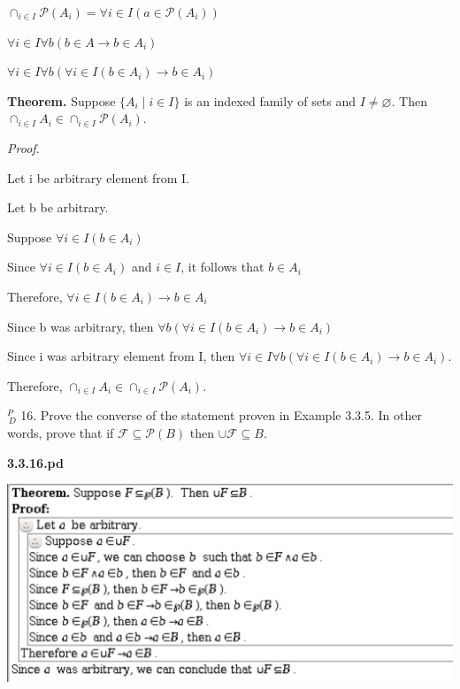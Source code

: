 \documentclass{article}
\begin{document}
$\cap_{i \in I} \mathcal{P} (A_i) = \forall i \in I (a \in \mathcal{P}(A_i))$

$\forall i \in I \forall b (b \in A \to b \in A_i)$

$\forall i \in I \forall b (\forall i \in I (b \in A_i) \to b \in A_i)$

\vspace{20pt}

\textbf{Theorem.} Suppose $\{A_i \mid i \in I\}$ is an indexed family of sets and $I \neq \varnothing$. Then $\cap_{i \in I} A_i \in \cap_{i \in I} \mathcal{P} (A_i)$.

\textit{Proof.}

Let i be arbitrary element from I.

\quad Let b be arbitrary.

\quad \quad Suppose $\forall i \in I (b \in A_i)$

\quad \quad \quad Since $\forall i \in I (b \in A_i)$ and $i \in I$, it follows that $b \in A_i$

\quad \quad Therefore, $\forall i \in I (b \in A_i) \to b \in A_i$

\quad Since b was arbitrary, then $\forall b (\forall i \in I (b \in A_i) \to b \in A_i)$

Since i was arbitrary element from I, then $\forall i \in I \forall b (\forall i \in I (b \in A_i) \to b \in A_i)$.

Therefore, $\cap_{i \in I} A_i \in \cap_{i \in I} \mathcal{P} (A_i)$.

\vspace{30pt}

$^{\textit{P}}_{\, \textit{D}}$ 16. Prove the converse of the statement proven in Example 3.3.5. In other
words, prove that if $\mathcal{F} \subseteq \mathcal{P} (B)$ then $\cup \mathcal{F} \subseteq B$.
\vspace{30pt}

\textbf{3.3.16.pd}
\vspace{10pt}

\includegraphics[width=\textwidth]{3_3_16}
\end{document}
